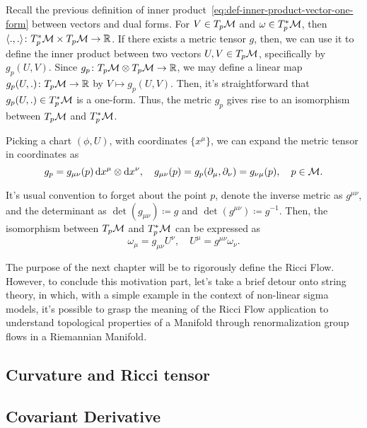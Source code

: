 Recall the previous definition of inner product~\eqref{eq:def-inner-product-vector-one-form} between vectors and dual forms. For $V \in T_p \mathcal{M}$ and $\omega \in T^*_p \mathcal{M}$, then $\langle ., . \rangle \colon T^*_p \mathcal{M} \times T_p \mathcal{M} \to \mathbb{R}$. If there exists a metric tensor $g$, then, we can use it to define the inner product between two vectors $U,V \in T_p \mathcal{M}$, specifically by $g_p(U,V)$. Since $g_p \colon T_p \mathcal{M} \otimes T_p \mathcal{M} \to \mathbb{R}$, we may define a linear map $g_p(U,.) \colon T_p \mathcal{M} \to \mathbb{R}$ by $V \mapsto g_p(U,V)$. Then, it's straightforward that $g_p(U,.) \in T^*_p \mathcal{M}$ is a one-form. Thus, the metric $g_p$ gives rise to an isomorphism between $T_p \mathcal{M}$ and $T^*_p \mathcal{M}$.

Picking a chart $(\phi,U)$, with coordinates $\{ x^\mu \}$, we can expand the metric tensor in coordinates as
\begin{equation}
    g_p = g_{\mu\nu}(p) \mathop{}\!\mathrm{d} x^\mu \otimes \mathop{}\!\mathrm{d} x^\nu, \quad g_{\mu\nu}(p) = g_p (\partial_\mu, \partial_\nu) = g_{\nu\mu}(p), \quad p \in \mathcal{M}.
\end{equation}

It's usual convention to forget about the point $p$, denote the inverse metric as $g^{\mu\nu}$, and the determinant as $\det(g_{\mu\nu}) \coloneq g$ and $\det(g^{\mu\nu}) \coloneq g^{-1}$. Then, the isomorphism between $T_p \mathcal{M}$ and $T^*_p \mathcal{M}$ can be expressed as
\begin{equation}
    \omega_\mu = g_{\mu\nu} U^\nu, \quad U^\mu = g^{\mu\nu} \omega_\nu .
\end{equation}

The purpose of the next chapter will be to rigorously define the Ricci Flow. However, to conclude this motivation part, let's take a brief detour onto string theory, in which, with a simple example in the context of non-linear sigma models, it's possible to grasp the meaning of the Ricci Flow application to understand topological properties of a Manifold through renormalization group flows in a Riemannian Manifold.

\subsection{Curvature and Ricci tensor}
\subsection{Covariant Derivative}
